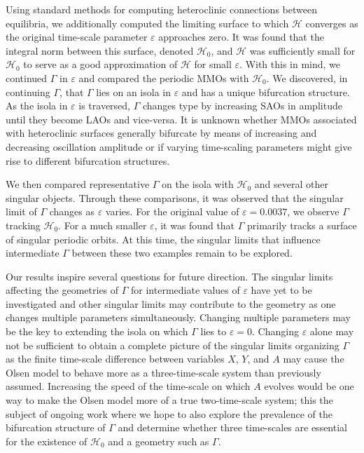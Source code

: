 \documentclass{ws-ijbc}
\begin{document}
Using standard methods for computing heteroclinic connections between equilibria, we additionally computed the limiting surface to which $\mathscr{H}$ converges as the original time-scale parameter $\varepsilon$ approaches zero.  It was found that the integral norm between this surface, denoted $\mathscr{H}_0$, and $\mathscr{H}$ was sufficiently small for $\mathscr{H}_0$ to serve as a good approximation of $\mathscr{H}$ for small $\varepsilon$.  With this in mind, we continued $\Gamma$ in $\varepsilon$ and compared the periodic MMOs with $\mathscr{H}_0$.  We discovered, in continuing $\Gamma$, that $\Gamma$ lies on an isola in $\varepsilon$ and has a unique bifurcation structure.  As the isola in $\varepsilon$ is traversed, $\Gamma$ changes type by increasing SAOs in amplitude until they become LAOs and vice-versa.  It is unknown whether MMOs associated with heteroclinic surfaces generally bifurcate by means of increasing and decreasing oscillation amplitude or if varying time-scaling parameters might give rise to different bifurcation structures.

We then compared representative $\Gamma$ on the isola with $\mathscr{H}_0$ and several other singular objects.  Through these comparisons, it was observed that the singular limit of $\Gamma$ changes as $\varepsilon$ varies.  For the original value of $\varepsilon=0.0037$, we observe $\Gamma$ tracking $\mathscr{H}_0$. For a much smaller $\varepsilon$, it was found that $\Gamma$ primarily tracks a surface of singular periodic orbits.   At this time, the singular limits that influence intermediate $\Gamma$ between these two examples remain to be explored.

Our results inspire several questions for future direction.  The singular limits affecting the geometries of $\Gamma$ for intermediate values of $\varepsilon$ have yet to be investigated and other singular limits may contribute to the geometry as one changes multiple parameters simultaneously.  Changing multiple parameters may be the key to extending the isola on which $\Gamma$ lies to $\varepsilon=0$.  Changing $\varepsilon$ alone may not be sufficient to obtain a complete picture of the singular limits organizing $\Gamma$ as the finite time-scale difference between variables $X$, $Y$, and $A$ may cause the Olsen model to behave more as a three-time-scale system than previously assumed.  Increasing the speed of the time-scale on which $A$ evolves would be one way to make the Olsen model more of a true two-time-scale system; this the subject of ongoing work where we hope to also explore the prevalence of the bifurcation structure of $\Gamma$ and determine whether three time-scales are essential for the existence of $\mathscr{H}_0$ and a geometry such as $\Gamma$.
\end{document}
